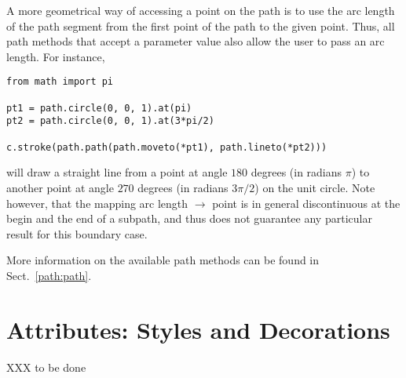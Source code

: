 A more geometrical way of accessing a point on the path is to use the
arc length of the path segment from the first point of the path to the
given point. Thus, all \PyX{} path methods that accept a parameter
value also allow the user to pass an arc length. For instance,
\begin{verbatim}
from math import pi

pt1 = path.circle(0, 0, 1).at(pi)
pt2 = path.circle(0, 0, 1).at(3*pi/2)

c.stroke(path.path(path.moveto(*pt1), path.lineto(*pt2)))
\end{verbatim}
will draw a straight line from a point at angle $180$ degrees (in
radians $\pi$) to another point at angle $270$ degrees (in radians
$3\pi/2$) on the unit circle. Note however, that the mapping arc
length $\to$ point is in general discontinuous at the begin and the
end of a subpath, and thus \PyX{} does not guarantee any particular
result for this boundary case.

More information on the available path methods can be found 
in Sect.~\ref{path:path}. 

\section{Attributes: Styles and Decorations}

XXX to be done

